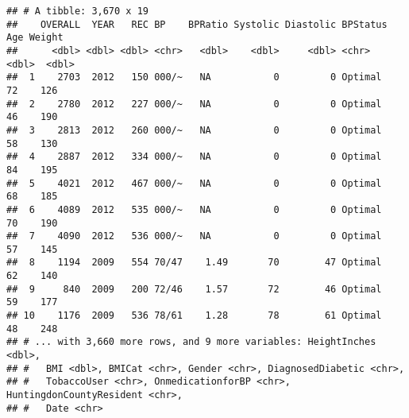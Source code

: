 \documentclass[
]{article}
\newenvironment{Shaded}{\begin{snugshade}}{\end{snugshade}}
\newcommand{\KeywordTok}[1]{\textcolor[rgb]{0.13,0.29,0.53}{\textbf{#1}}}
\newcommand{\NormalTok}[1]{#1}
\newcommand{\OperatorTok}[1]{\textcolor[rgb]{0.81,0.36,0.00}{\textbf{#1}}}
\newcommand{\StringTok}[1]{\textcolor[rgb]{0.31,0.60,0.02}{#1}}
\begin{document}
\begin{Shaded}
\end{Shaded}

\begin{verbatim}
## # A tibble: 3,670 x 19
##    OVERALL  YEAR   REC BP    BPRatio Systolic Diastolic BPStatus   Age Weight
##      <dbl> <dbl> <dbl> <chr>   <dbl>    <dbl>     <dbl> <chr>    <dbl>  <dbl>
##  1    2703  2012   150 000/~   NA           0         0 Optimal     72    126
##  2    2780  2012   227 000/~   NA           0         0 Optimal     46    190
##  3    2813  2012   260 000/~   NA           0         0 Optimal     58    130
##  4    2887  2012   334 000/~   NA           0         0 Optimal     84    195
##  5    4021  2012   467 000/~   NA           0         0 Optimal     68    185
##  6    4089  2012   535 000/~   NA           0         0 Optimal     70    190
##  7    4090  2012   536 000/~   NA           0         0 Optimal     57    145
##  8    1194  2009   554 70/47    1.49       70        47 Optimal     62    140
##  9     840  2009   200 72/46    1.57       72        46 Optimal     59    177
## 10    1176  2009   536 78/61    1.28       78        61 Optimal     48    248
## # ... with 3,660 more rows, and 9 more variables: HeightInches <dbl>,
## #   BMI <dbl>, BMICat <chr>, Gender <chr>, DiagnosedDiabetic <chr>,
## #   TobaccoUser <chr>, OnmedicationforBP <chr>, HuntingdonCountyResident <chr>,
## #   Date <chr>
\end{verbatim}

\begin{Shaded}
\end{Shaded}
\end{document}
